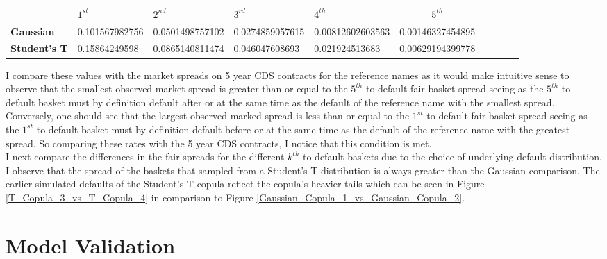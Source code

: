 \documentclass{report}
\theoremstyle{plain}
\theoremstyle{definition}
\begin{document}
\begin{center}
	\begin{tabular}{|l|l|l|l|l|c|c|c|c|c|}
		\hline
		\textbf{} & \textbf{$1^{st}$} & \textbf{$2^{nd}$} & \textbf{$3^{rd}$} & \textbf{$4^{th}$} & \textbf{$5^{th}$}\\\hhline{|=|=|=|=|=|=|}
		\textbf{Gaussian} & 0.101567982756 & 0.0501498757102 & 0.0274859057615 & 0.00812602603563 & 0.00146327454895\\
		\textbf{Student's T} & 0.15864249598 & 0.0865140811474 & 0.046047608693 & 0.021924513683 & 0.00629194399778\\
		\hline
	\end{tabular}
\end{center}


I compare these values with the market spreads on 5 year CDS contracts for the reference names as it would make intuitive sense to observe that the smallest observed market spread is greater than or equal to the $5^{th}$-to-default fair basket spread seeing as the $5^{th}$-to-default basket must by definition default after or at the same time as the default of the reference name with the smallest spread. Conversely, one should see that the largest observed marked spread is less than or equal to the $1^{st}$-to-default fair basket spread seeing as the $1^{st}$-to-default basket must by definition default before or at the same time as the default of the reference name with the greatest spread. So comparing these rates with the 5 year CDS contracts, I notice that this condition is met.\\

I next compare the differences in the fair spreads for the different $k^{th}$-to-default baskets due to the choice of underlying default distribution.\\


I observe that the spread of the baskets that sampled from a Student's T distribution is always greater than the Gaussian comparison. The earlier simulated defaults of the Student's T copula reflect the copula's heavier tails which can be seen in Figure \ref{T_Copula_3_vs_T_Copula_4} in comparison to Figure \ref{Gaussian_Copula_1_vs_Gaussian_Copula_2}.


\chapter{Model Validation}
\end{document}
